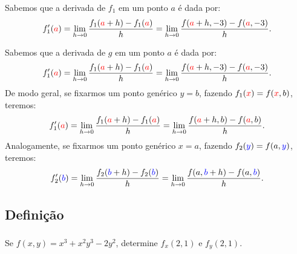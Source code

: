 \begin{frame}[label=der-parciais]
Sabemos que a derivada de $f_1$ em um ponto {\color{red} $a$} é dada por:
\[f_1'({\color{red}a})=\lim\limits_{h\to0}\frac{f_1({\color{red}a}+h)-f_1({\color{red}a})}{h}=\lim\limits_{h\to0}\frac{f({\color{red}a}+h,-3)-f({\color{red}a},-3)}{h}.\]
\end{frame}


\begin{frame}[label=der-parciais]
	Sabemos que a derivada de $g$ em um ponto {\color{red} $a$} é dada por:
	\[f_1'({\color{red}a})=\lim\limits_{h\to0}\frac{f_1({\color{red}a}+h)-f_1({\color{red}a})}{h}=\lim\limits_{h\to0}\frac{f({\color{red}a}+h,-3)-f({\color{red}a},-3)}{h}.\]
	De modo geral, se fixarmos um ponto genérico $y=b$, fazendo $f_1({\color{red}x})=f({\color{red}x},b)$, teremos:
	\[f_1'({\color{red}a})=\lim\limits_{h\to0}\frac{f_1({\color{red}a}+h)-f_1({\color{red}a})}{h}=\lim\limits_{h\to0}\frac{f({\color{red}a}+h,b)-f({\color{red}a},b)}{h}.\]
	Analogamente, se fixarmos um ponto genérico $x=a$, fazendo $f_2({\color{blue}y})=f(a,{\color{blue}y})$, teremos:
	\[f_2'({\color{blue}b})=\lim\limits_{h\to0}\frac{f_2({\color{blue}b}+h)-f_2({\color{blue}b})}{h}=\lim\limits_{h\to0}\frac{f(a,{\color{blue}b}+h)-f(a,{\color{blue}b})}{h}.\]
\end{frame}

\subsection*{Definição}
\begin{frame}[label=der-parciais]
		\frametitle{}
		
\begin{exe}
Se $f(x,y)=x^3+x^2y^3-2y^2$, determine $f_x(2,1)$ e $f_y(2,1)$.
\end{exe}
\end{frame}


